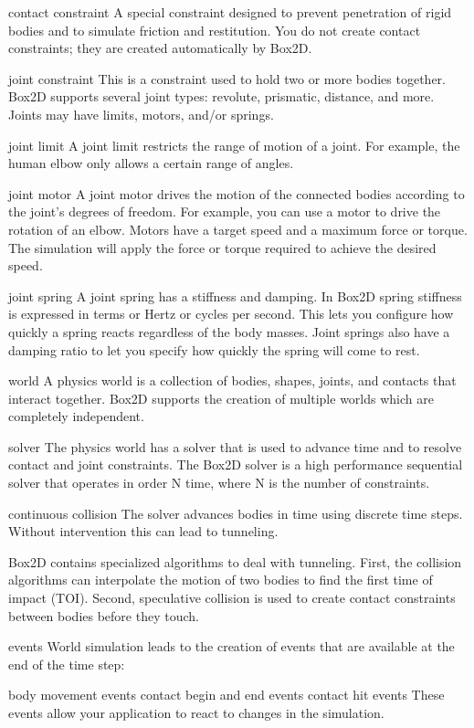 \documentclass{projdoc}
\begin{document}
contact constraint
A special constraint designed to prevent penetration of rigid bodies and to simulate friction and restitution. You do not create contact constraints; they are created automatically by Box2D.

joint constraint
This is a constraint used to hold two or more bodies together. Box2D supports several joint types: revolute, prismatic, distance, and more. Joints may have limits, motors, and/or springs.

joint limit
A joint limit restricts the range of motion of a joint. For example, the human elbow only allows a certain range of angles.

joint motor
A joint motor drives the motion of the connected bodies according to the joint's degrees of freedom. For example, you can use a motor to drive the rotation of an elbow. Motors have a target speed and a maximum force or torque. The simulation will apply the force or torque required to achieve the desired speed.

joint spring
A joint spring has a stiffness and damping. In Box2D spring stiffness is expressed in terms or Hertz or cycles per second. This lets you configure how quickly a spring reacts regardless of the body masses. Joint springs also have a damping ratio to let you specify how quickly the spring will come to rest.

world
A physics world is a collection of bodies, shapes, joints, and contacts that interact together. Box2D supports the creation of multiple worlds which are completely independent.

solver
The physics world has a solver that is used to advance time and to resolve contact and joint constraints. The Box2D solver is a high performance sequential solver that operates in order N time, where N is the number of constraints.

continuous collision
The solver advances bodies in time using discrete time steps. Without intervention this can lead to tunneling.

Box2D contains specialized algorithms to deal with tunneling. First, the collision algorithms can interpolate the motion of two bodies to find the first time of impact (TOI). Second, speculative collision is used to create contact constraints between bodies before they touch.

events
World simulation leads to the creation of events that are available at the end of the time step:

body movement events
contact begin and end events
contact hit events
These events allow your application to react to changes in the simulation.
\end{document}
